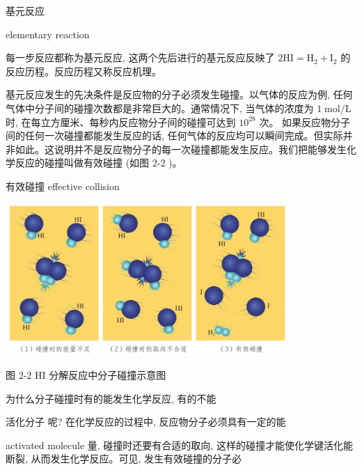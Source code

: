 \documentclass[10pt]{article}
\begin{document}
\begin{mdframed}

基元反应

elementary reaction

\end{mdframed}

每一步反应都称为基元反应, 这两个先后进行的基元反应反映了 \(2\mathrm{{HI}} = {\mathrm{H}}_{2} + {\mathrm{I}}_{2}\) 的反应历程。反应历程又称反应机理。

基元反应发生的先决条件是反应物的分子必须发生碰撞。以气体的反应为例, 任何气体中分子间的碰撞次数都是非常巨大的。通常情况下, 当气体的浓度为 \(1\mathrm{\;{mol}}/\mathrm{L}\) 时, 在每立方厘米、每秒内反应物分子间的碰撞可达到 \({10}^{28}\) 次。 如果反应物分子间的任何一次碰撞都能发生反应的话, 任何气体的反应均可以瞬间完成。但实际并非如此。这说明并不是反应物分子的每一次碰撞都能发生反应。我们把能够发生化学反应的碰撞叫做有效碰撞 (如图 2-2 )。

\begin{mdframed}

有效碰撞 effective collision

\end{mdframed}


\begin{center}
\includegraphics[max width=0.8\textwidth]{images/0190da9d-8bfd-732f-bc2c-0b21d0f13b91_33_563553.jpg}
\end{center}

图 2-2 HI 分解反应中分子碰撞示意图

为什么分子碰撞时有的能发生化学反应, 有的不能

活化分子 呢? 在化学反应的过程中, 反应物分子必须具有一定的能

activated molecule 量, 碰撞时还要有合适的取向, 这样的碰撞才能使化学键活化能 断裂, 从而发生化学反应。可见, 发生有效碰撞的分子必
\end{document}
